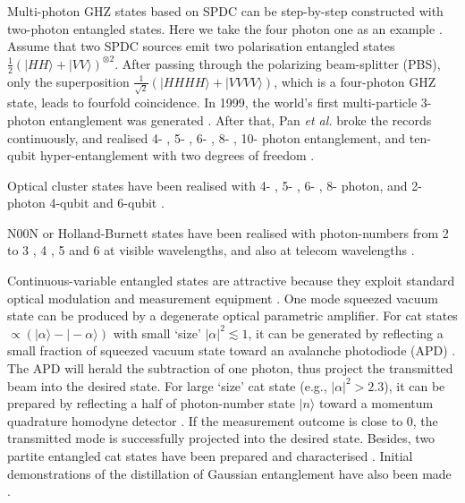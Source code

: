 \documentclass[aps,rmp,twocolumn,amsmath,amssymb,nofootinbib,superscriptaddress,longbibliography,floatfix,table-of-contents,eqsecnum]{revtex4-1}
\newcommand{\ket}[1]{|#1\rangle}
\begin{document}
Multi-photon GHZ states based on SPDC \cite{kwiat1995new} can be step-by-step constructed with two-photon entangled states. Here we take the four photon one as an example \cite{pan2012multiphoton}. Assume that two SPDC sources emit two polarisation entangled states \mbox{$\frac{1}{2}(\ket{HH} + \ket{VV})^{\otimes 2}$}. After passing through the polarizing beam-splitter (PBS), only the superposition \mbox{$\frac{1}{\sqrt{2}}(\ket{HHHH} + \ket{VVVV})$}, which is a four-photon GHZ state, leads to fourfold coincidence. In 1999, the world's first multi-particle 3-photon entanglement was generated \cite{bouwmeester1999observation, pan2000experimental}. After that, Pan \textit{et al.} broke the records continuously, and realised 4- \cite{zhao2003experimental}, 5- \cite{zhao2004experimental}, 6- \cite{lu2007experimental}, 8- \cite{yao2012observation}, 10- \cite{bib:tenPhotEnt} photon entanglement, and ten-qubit hyper-entanglement with two degrees of freedom \cite{gao2010experimental}.

Optical cluster states have been realised with 4- \cite{walther2005experimental}, 5- \cite{lu2008experimental}, 6- \cite{lu2007experimental}, 8- \cite{yao2012experimental} photon, and 2-photon 4-qubit \cite{chen2007experimental} and 6-qubit \cite{ceccarelli2009experimental}.

N00N or Holland-Burnett states have been realised with photon-numbers from 2 \cite{edamatsu2002measurement} to 3 \cite{mitchell2004super}, 4 \cite{walther2004broglie, nagata2007beating, matthews2011heralding}, 5 \cite{afek2010high} and 6 \cite{xiang2012optimal} at visible wavelengths, and also at telecom wavelengths \cite{yabuno2012four, bisht2015spectral, jin2016detection}.

Continuous-variable entangled states are attractive because they exploit standard optical modulation and measurement equipment \cite{ralph2009bright}. One mode squeezed vacuum state can be produced by a degenerate optical parametric amplifier. For cat states \mbox{$\propto(\ket{\alpha} - \ket{-\alpha})$} with small `size' \mbox{$|\alpha|^2 \lesssim 1$}, it can be generated by reflecting a small fraction of squeezed vacuum state toward an avalanche photodiode (APD) \cite{neergaard2006generation, ourjoumtsev2006generating, wakui2007photon}. The APD will herald the subtraction of one photon, thus project the transmitted beam into the desired state. For large `size' cat state (e.g., \mbox{$|\alpha|^2 > 2.3$}), it can be prepared by reflecting a half of photon-number state $\ket{n}$ toward a momentum quadrature homodyne detector \cite{ourjoumtsev2007generation,takahashi2008generation}. If the measurement outcome is close to 0, the transmitted mode is successfully projected into the desired state. Besides, two partite entangled cat states have been prepared and characterised \cite{ourjoumtsev2009preparation}. Initial demonstrations of the distillation of Gaussian entanglement have also been made \cite{takahashi2010entanglement, xiang2010heralded}.
\end{document}
